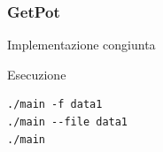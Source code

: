 \documentclass{beamer}
\begin{document}

\begin{frame}[fragile]

    \frametitle{GetPot}

    \begin{block}{Implementazione congiunta}
        \lstset{basicstyle=\scriptsize\sf}
            
        \lstset{basicstyle=\sf}
    \end{block}

\end{frame}


\begin{frame}[fragile]

    \begin{block}{Esecuzione}
        \begin{verbatim}
./main -f data1
./main --file data1
./main
        \end{verbatim}
    \end{block}

\end{frame}
\end{document}
